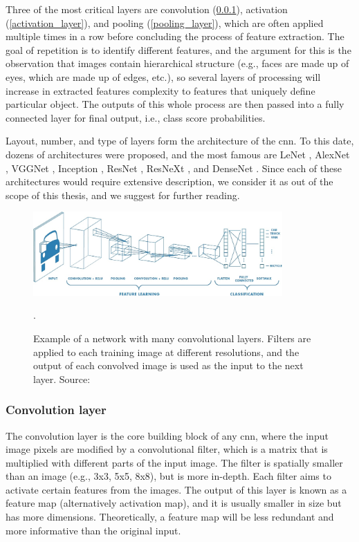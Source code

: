         Three of the most critical layers are convolution (\ref{convolutional_layer}), activation (\ref{activation_layer}), and pooling (\ref{pooling_layer}), which are often applied multiple times in a row before concluding the process of feature extraction. The goal of repetition is to identify different features, and the argument for this is the observation that images contain hierarchical structure (e.g., faces are made up of eyes, which are made up of edges, etc.), so several layers of processing will increase in extracted features complexity to features that uniquely define particular object. The outputs of this whole process are then passed into a fully connected layer for final output, i.e., class score probabilities. 
        
        Layout, number, and type of layers form the architecture of the \gls{cnn}. To this date, dozens of architectures were proposed, and the most famous are LeNet \cite{lecun1998gradient}, AlexNet \cite{krizhevsky2012imagenet}, VGGNet \cite{simonyan2014very}, Inception \cite{szegedy2016rethinking}, ResNet \cite{he2016deep}, ResNeXt \cite{xie2017aggregated}, and DenseNet \cite{huang2017densely}. Since each of these architectures would require extensive description, we consider it as out of the scope of this thesis, and we suggest \cite{cs231n, dascnnoverview, jordancnnoverview} for further reading. 

        \begin{figure}[ht]
            \centering
            \includegraphics[width=0.85\textwidth]{resources/convolutional_neural_network.png}
            \caption{Example of a network with many convolutional layers. Filters are applied to each training image at different resolutions, and the output of each convolved image is used as the input to the next layer. Source: \cite{mathworkscnn}}.
            \label{fig:convolutional neural netwok}
        \end{figure}
        
        \subsubsection{Convolution layer}\label{convolutional_layer}
            The convolution layer is the core building block of any \gls{cnn}, where the input image pixels are modified by a convolutional filter, which is a matrix that is multiplied with different parts of the input image. The filter is spatially smaller than an image (e.g., 3x3, 5x5, 8x8), but is more in-depth. Each filter aims to activate certain features from the images. The output of this layer is known as a feature map (alternatively activation map), and it is usually smaller in size but has more dimensions. Theoretically, a feature map will be less redundant and more informative than the original input.
            
